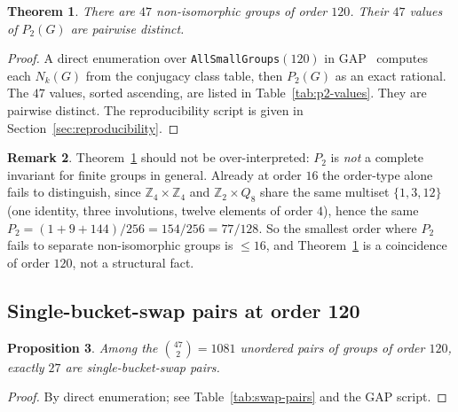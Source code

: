 \documentclass[11pt]{amsart}
\theoremstyle{plain}
\newtheorem{theorem}{Theorem}
\newtheorem{proposition}[theorem]{Proposition}
\theoremstyle{definition}
\newtheorem{remark}[theorem]{Remark}
\begin{document}
\begin{theorem}\label{thm:distinct-120}
There are $47$ non-isomorphic groups of order $120$. Their $47$ values of $P_2(G)$ are pairwise distinct.
\end{theorem}

\begin{proof}
A direct enumeration over \texttt{AllSmallGroups}$(120)$ in GAP~\cite{GAP4} computes each $N_k(G)$ from the conjugacy class table, then $P_2(G)$ as an exact rational. The $47$ values, sorted ascending, are listed in Table~\ref{tab:p2-values}. They are pairwise distinct. The reproducibility script is given in Section~\ref{sec:reproducibility}.
\end{proof}

\begin{remark}
Theorem~\ref{thm:distinct-120} should not be over-interpreted: $P_2$ is \emph{not} a complete invariant for finite groups in general. Already at order $16$ the order-type alone fails to distinguish, since $\mathbb{Z}_4 \times \mathbb{Z}_4$ and $\mathbb{Z}_2 \times Q_8$ share the same multiset $\{1, 3, 12\}$ (one identity, three involutions, twelve elements of order $4$), hence the same $P_2 = (1 + 9 + 144)/256 = 154/256 = 77/128$. So the smallest order where $P_2$ fails to separate non-isomorphic groups is $\leq 16$, and Theorem~\ref{thm:distinct-120} is a coincidence of order $120$, not a structural fact.
\end{remark}

\subsection{Single-bucket-swap pairs at order 120}

\begin{proposition}\label{prop:swap-count}
Among the $\binom{47}{2} = 1081$ unordered pairs of groups of order $120$, exactly $27$ are single-bucket-swap pairs.
\end{proposition}

\begin{proof}
By direct enumeration; see Table~\ref{tab:swap-pairs} and the GAP script.
\end{proof}
\end{document}
